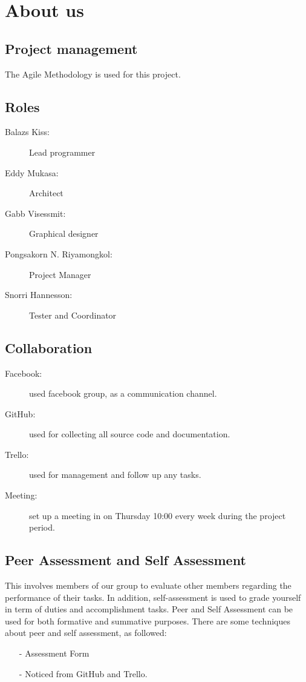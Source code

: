 \documentclass[11pt]{article}
\begin{document}

\section{About us}
\subsection{Project management}
The Agile Methodology is used for this project. 

\subsection{Roles}
\begin{description}
\item[Balazs Kiss:] Lead programmer
\item[Eddy Mukasa:] Architect
\item[Gabb Visessmit:] Graphical designer
\item[Pongsakorn N. Riyamongkol:] Project Manager
\item[Snorri Hannesson:] Tester and Coordinator
\end{description}

\subsection{Collaboration}
\begin{description}
\item[Facebook:] used facebook group, as a communication channel.
\item[GitHub:] used for collecting all source code and documentation.
\item[Trello:] used for management and follow up any tasks.
\item[Meeting:] set up a meeting in on Thursday 10:00 every week during the project period.
\end{description}

\subsection{Peer Assessment and Self Assessment}
This involves members of our group to evaluate other members regarding the performance of
their tasks. In addition, self-assessment is used to grade yourself in term of duties and
accomplishment tasks. Peer and Self Assessment can be used for both formative and summative
purposes. There are some techniques about peer and self assessment, as followed:
\begin{itemize}
\item[-] Assessment Form
\item[-] Noticed from GitHub and Trello.  
\end{itemize}
\end{document}
